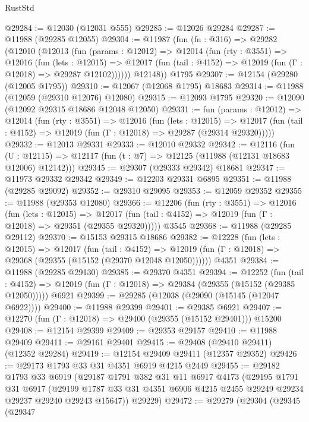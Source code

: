 \begin{lexlean}{RustStd}
\begin{coremodule}
@29284 := @12030 (@12031 @555)
@29285 := @12026 @29284
@29287 := @11988 (@29285 @12055)
@29304 := @11987
    (fun (fn : @316) =>
    @29282
      (@12010
        (@12013
          (fun (params : @12012) =>
          @12014
            (fun (rty : @3551) =>
            @12016
              (fun (lets : @12015) =>
              @12017 (fun (tail : @4152) => @12019 (fun (Γ : @12018) => @29287 @12102))))))
        @12148))
    @1795
@29307 := @12154 (@29280 (@12005 @1795))
@29310 := @12067 (@12068 @1795) @18683
@29314 := @11988 (@12059 (@29310 @12076) @12080)
@29315 := @12093 @1795
@29320 := @12090 (@12092 @29315 @18686 @12048 @12050)
@29331 := fun (params : @12012) =>
  @12014
    (fun (rty : @3551) =>
    @12016
      (fun (lets : @12015) =>
      @12017 (fun (tail : @4152) => @12019 (fun (Γ : @12018) => @29287 (@29314 @29320)))))
@29332 := @12013 @29331
@29333 := @12010 @29332
@29342 := @12116
    (fun (U : @12115) => @12117 (fun (t : @7) => @12125 (@11988 (@12131 @18683 @12006) @12142)))
@29345 := @29307 (@29333 @29342) @18681
@29347 := @11973 @29332 @29342
@29349 := @12203 @29331 @6895
@29351 := @11988 (@29285 @29092)
@29352 := @29310 @29095
@29353 := @12059 @29352
@29355 := @11988 (@29353 @12080)
@29366 := @12206
    (fun (rty : @3551) =>
    @12016
      (fun (lets : @12015) =>
      @12017 (fun (tail : @4152) => @12019 (fun (Γ : @12018) => @29351 (@29355 @29320)))))
    @3545
@29368 := @11988 (@29285 @29112)
@29370 := @15153 @29315 @18686
@29382 := @12228
    (fun (lets : @12015) =>
    @12017
      (fun (tail : @4152) =>
      @12019 (fun (Γ : @12018) => @29368 (@29355 (@15152 (@29370 @12048 @12050))))))
    @4351
@29384 := @11988 (@29285 @29130)
@29385 := @29370 @4351
@29394 := @12252
    (fun (tail : @4152) => @12019 (fun (Γ : @12018) => @29384 (@29355 (@15152 (@29385 @12050)))))
    @6921
@29399 := @29285 (@12038 (@29090 (@15145 (@12047 @6922))))
@29400 := @11988 @29399
@29401 := @29385 @6921
@29407 := @12270 (fun (Γ : @12018) => @29400 (@29355 (@15152 @29401))) @15200
@29408 := @12154 @29399
@29409 := @29353 @29157
@29410 := @11988 @29409
@29411 := @29161 @29401
@29415 := @29408 (@29410 @29411) (@12352 @29284)
@29419 := @12154 @29409 @29411 (@12357 @29352)
@29426 := @29173 @1793 @33 @31 @4351 @6919 @4215 @2449
@29455 := @29182
    @1793
    @33
    @6919
    (@29187
      @1791
      @382
      @31
      @11
      @6917
      @4173
      (@29195
        @1791
        @31
        @6917
        (@29199 @1787 @33 @31 @4351 @6906 @4215 @2455 @29249 @29234 @29237 @29240 @29243 @15647))
      @29229)
@29472 := @29279
    (@29304
      (@29345
        (@29347

\end{coremodule}
\end{lexlean}
